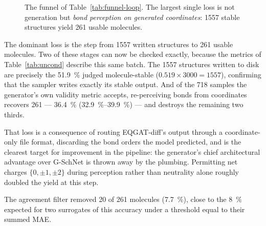 \documentclass[runningheads]{llncs}
\begin{document}
\begin{figure}[t]
\centering
{}
\caption{The funnel of Table~\ref{tab:funnel-loop}. The largest single
loss is not generation but \emph{bond perception on generated
coordinates}: \num{1557} stable structures yield \num{261} usable
molecules.}
\label{fig:funnel}
\end{figure}

The dominant loss is the step from \num{1557} written structures to
\num{261} usable molecules. Two of these stages can now be checked
exactly, because the metrics of Table~\ref{tab:uncond} describe this same
batch. The \num{1557} structures written to disk are precisely the
\SI{51.9}{\percent} judged molecule-stable ($0.519\times\num{3000}=\num{1557}$),
confirming that the sampler writes exactly its stable output. And of the
\num{718} samples the generator's own validity metric accepts,
re-perceiving bonds from coordinates recovers \num{261} --- 
\SI{36.4}{\percent} (\SIrange{32.9}{39.9}{\percent}) --- and destroys the
remaining two thirds.

That loss is a consequence of routing EQGAT-diff's output through a
coordinate-only file format, discarding the bond orders the model
predicted, and is the clearest target for improvement in the pipeline:
the generator's chief architectural advantage over G-SchNet is thrown
away by the plumbing. Permitting net charges $\{0,\pm1,\pm2\}$ during
perception rather than neutrality alone roughly doubled the yield at this
step.

The agreement filter removed \num{20} of \num{261} molecules
(\SI{7.7}{\percent}), close to the \SI{8}{\percent} expected for two
surrogates of this accuracy under a threshold equal to their summed MAE.
\end{document}
